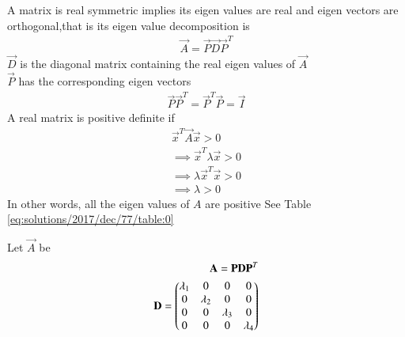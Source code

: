 %
A matrix is real symmetric implies its eigen values are real and eigen vectors are orthogonal,that is its eigen value decomposition is
\begin{align}
 \vec{A}=\vec{P}\vec{D}\vec{P}^T
\end{align}
$\vec{D}$ is the diagonal matrix containing the real eigen values of $\vec{A}$\\
$\vec{P}$ has the corresponding eigen vectors
\begin{align}
    \vec{P}\vec{P}^T=\vec{P}^T\vec{P}=\vec{I}
\end{align}
A real matrix is positive definite if 
\begin{align}
    \vec{x}^T\vec{A}\vec{x}>0\\
    \implies  \vec{x}^T\lambda\vec{x}>0\\
    \implies \lambda \vec{x}^T\vec{x}>0\\
    \implies \lambda>0
\end{align}
In other words, all the eigen values of $A$ are positive
See Table \ref{eq:solutions/2017/dec/77/table:0}

Let $\vec{A}$ be
\begin{align}
    \mathbf{A}=\mathbf{P}\mathbf{D}\mathbf{P}^T\\
    \mathbf{D}=\begin{pmatrix}\lambda_1&0&0&0\\0&\lambda_2&0&0\\0&0&\lambda_3&0\\0&0&0&\lambda_4\end{pmatrix}
\end{align}




